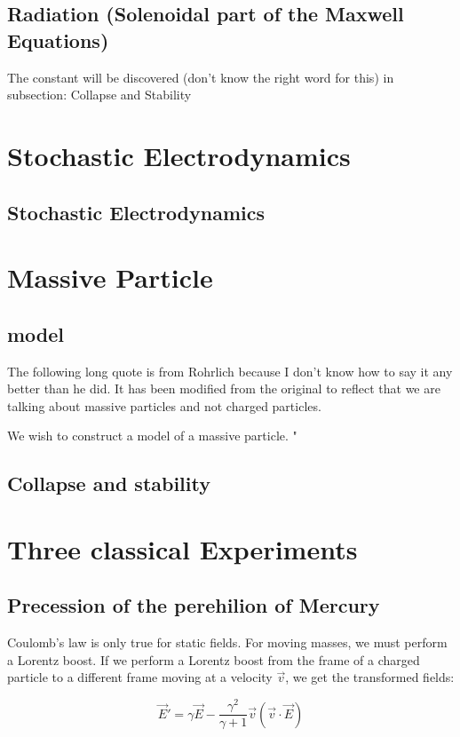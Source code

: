 \documentclass {article}
\begin{document}
\subsection{Radiation (Solenoidal part of the Maxwell Equations)}
The constant will be discovered (don't know the right word for this) in subsection: Collapse and Stability
\newpage

\section{Stochastic Electrodynamics}
\subsection{Stochastic Electrodynamics}
\newpage

\section{Massive Particle}
\subsection{model}
The following long quote is from Rohrlich because I don't know how to say it any better than he did. It has been modified from the original to reflect that we are talking about massive particles and not charged particles.

We wish to construct a model of a massive particle. "

\newpage
\subsection{Collapse and stability}
\newpage


\section{Three classical Experiments}
\subsection{Precession of the perehilion of Mercury}


Coulomb's law is only true for static fields. For moving masses, we must perform a Lorentz boost. If we perform a  Lorentz boost from the frame of a charged particle to a different frame moving at a velocity $\vec v$, we get the transformed fields:

$$\vec E' = \gamma \vec E - \frac {\gamma^2} {\gamma + 1} \vec v (\vec v \cdot \vec E) $$
\end{document}
